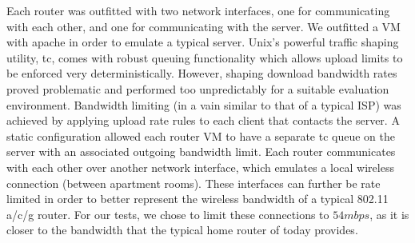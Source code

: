\documentclass[12pt]{article}
\begin{document}
	Each router was outfitted with two network interfaces, one for communicating with each other, and one for communicating with the server. We outfitted a VM with apache in order to emulate a typical server. Unix's powerful traffic shaping utility, tc, comes with robust queuing functionality which allows upload limits to be enforced very deterministically. However, shaping download bandwidth rates proved problematic and performed too unpredictably for a suitable evaluation environment. Bandwidth limiting (in a vain similar to that of a typical ISP) was achieved by applying upload rate rules to each client that contacts the server. A static configuration allowed each router VM to have a separate tc queue on the server with an associated outgoing bandwidth limit. Each router communicates with each other over another network interface, which emulates a local wireless connection (between apartment rooms). These interfaces can further be rate limited in order to better represent the wireless bandwidth of a typical 802.11 a/c/g router. For our tests, we chose to limit these connections to $54 mbps$, as it is closer to the bandwidth that the typical home router of today provides.
\end{document}
